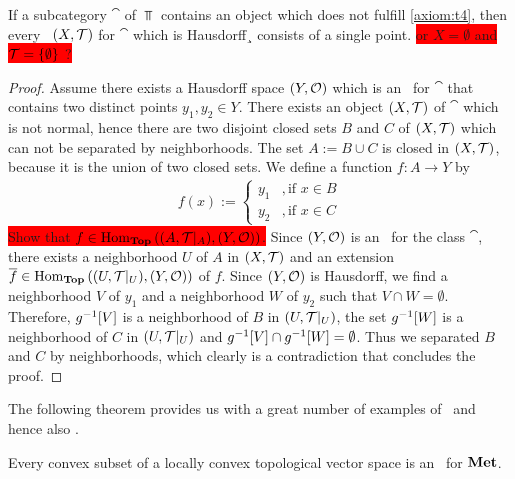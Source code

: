 \begin{proposition}
	If a subcategory $\cat$ of $\Top$ contains an object which does not fulfill \ref{axiom:t4}, then every \ane\ $\tspace$ for $\cat$ which is Hausdorff¸ consists  of a single point. \colorbox{red}{or $X = \emptyset$ and $\mathcal{T} = {\left \{ \emptyset \right \}}$ ?}
\end{proposition}
\begin{proof}
	Assume there exists a Hausdorff space $\tspace[Y][O]$ which is an \ane\ for $\cat$ that contains two distinct points $y_1, y_2 \in Y$. There exists an object $\tspace$ of $\cat$ which is not normal, hence there are two disjoint closed sets $B$ and $C$ of $\tspace$ which can not be separated by neighborhoods. The set $A := B \cup C$ is closed in $\tspace$, because it is the union of two closed sets. We define a function $f: A \to Y$ by
	\begin{align*}
		f(x) := 
		\begin{cases}
			y_1 &, \text{if } x \in B \\
			y_2 &, \text{if } x \in C
		\end{cases}
	\end{align*} 
	\colorbox{red}{Show that $f \in \Hom_\Top\pbraces{\reltspace, \tspace[Y][O]}$.} Since $\tspace[Y][O]$ is an \ane\ for the class $\cat$, there exists a neighborhood $U$ of $A$ in $\tspace$ and an extension $\overline{f} \in \Hom_\Top\pbraces{\reltspace[U], \tspace[Y][O]}$ of $f$. Since $\tspace[Y][O]$ is Hausdorff, we find a neighborhood $V$ of $y_1$ and a neighborhood $W$ of $y_2$ such that $V \cap W = \emptyset$. Therefore, $g^{-1}{\left [ V \right ]}$ is a neighborhood of $B$ in $\reltspace[U]$, the set $g^{-1}{\left [ W \right ]}$ is a neighborhood of $C$ in $\reltspace[U]$ and $g^{-1}{\left [ V \right ]} \cap g^{-1}{\left [ W \right ]} = \emptyset$. Thus we separated $B$ and $C$ by neighborhoods, which clearly is a contradiction that concludes the proof. 
\end{proof}

The following theorem provides us with a great number of examples of \aexs\ and hence also \anes. 

\begin{theorem}
	Every convex subset of a locally convex topological vector space is an \aex\ for $\mathbf{Met}$.
\end{theorem}

